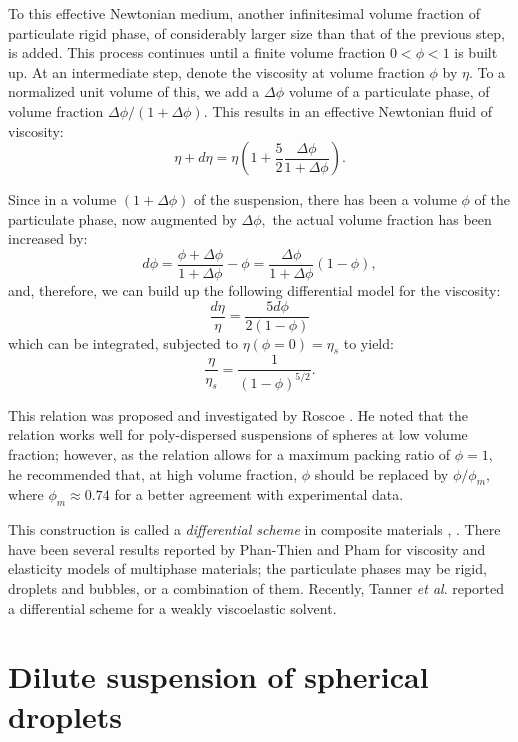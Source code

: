 \documentclass[english,fleqn,allpages]{ISTE_science}[2018/07/30]
\begin{document}
To this effective Newtonian medium, another infinitesimal volume fraction
of particulate rigid phase, of  considerably larger size than that
of the previous step, is added. This process continues until a finite
volume fraction $0<\phi<1$ is built up. At an intermediate step,
denote the viscosity at volume fraction $\phi$ by $\eta.$ To a normalized
unit volume of this, we add a $\Delta\phi$ volume of a particulate
phase, of volume fraction $\Delta\phi/\left(1+\Delta\phi\right).$
This results in an effective Newtonian fluid of viscosity:
\[
\eta+d\eta=\eta\left(1+\frac{5}{2}\frac{\Delta\phi}{1+\Delta\phi}\right).
\]

Since in a volume $\left(1+\Delta\phi\right)$ of the suspension,
there has been a volume $\phi$ of the particulate phase, now augmented
by $\Delta\phi,$ the actual volume fraction has been increased by:
\[
d\phi=\frac{\phi+\Delta\phi}{1+\Delta\phi}-\phi=\frac{\Delta\phi}{1+\Delta\phi}\left(1-\phi\right),
\]
and, therefore, we can build up the following differential model for
the viscosity: 
\[
\frac{d\eta}{\eta}=\frac{5d\phi}{2\left(1-\phi\right)}
\]
which can be integrated, subjected to $\eta\left(\phi=0\right)=\eta_{s}$
to yield: 
\begin{equation}
\frac{\eta}{\eta_{s}}=\frac{1}{\left(1-\phi\right)^{5/2}}.\label{rigid-poly}
\end{equation}

This relation was proposed and investigated by Roscoe \cite{roscoe52}.
He noted that the relation works well for poly-dispersed suspensions
of spheres at low volume fraction; however, as the relation allows
for a maximum packing ratio of $\phi=1,$ he recommended that, at
high volume fraction, $\phi$ should be replaced by $\phi/\phi_{m},$
where $\phi_{m}\approx0.74$ for a better agreement with experimental
data.

This construction is called a \textit{differential scheme} in composite
materials \cite{norris85}, \cite{norris85b}. There have been several
results reported by Phan-Thien and Pham \cite{phan-thien97} for viscosity
and elasticity models of multiphase materials; the particulate phases
may be rigid, droplets and bubbles, or a combination of them. Recently,
Tanner \textit{et al}. \cite{tanner10} reported a differential scheme
for a weakly viscoelastic solvent.


\section{Dilute suspension of spherical droplets}
\end{document}
